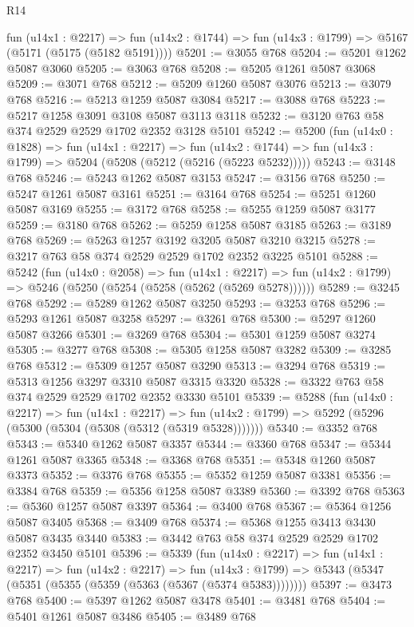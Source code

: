 \begin{lexlean}{R14}
\begin{coremodule}
    fun (u14x1 : @2217) =>
    fun (u14x2 : @1744) => fun (u14x3 : @1799) => @5167 (@5171 (@5175 (@5182 @5191))))
@5201 := @3055 @768
@5204 := @5201 @1262 @5087 @3060
@5205 := @3063 @768
@5208 := @5205 @1261 @5087 @3068
@5209 := @3071 @768
@5212 := @5209 @1260 @5087 @3076
@5213 := @3079 @768
@5216 := @5213 @1259 @5087 @3084
@5217 := @3088 @768
@5223 := @5217 @1258 @3091 @3108 @5087 @3113 @3118
@5232 := @3120 @763 @58 @374 @2529 @2529 @1702 @2352 @3128 @5101
@5242 := @5200
    (fun (u14x0 : @1828) =>
    fun (u14x1 : @2217) =>
    fun (u14x2 : @1744) => fun (u14x3 : @1799) => @5204 (@5208 (@5212 (@5216 (@5223 @5232)))))
@5243 := @3148 @768
@5246 := @5243 @1262 @5087 @3153
@5247 := @3156 @768
@5250 := @5247 @1261 @5087 @3161
@5251 := @3164 @768
@5254 := @5251 @1260 @5087 @3169
@5255 := @3172 @768
@5258 := @5255 @1259 @5087 @3177
@5259 := @3180 @768
@5262 := @5259 @1258 @5087 @3185
@5263 := @3189 @768
@5269 := @5263 @1257 @3192 @3205 @5087 @3210 @3215
@5278 := @3217 @763 @58 @374 @2529 @2529 @1702 @2352 @3225 @5101
@5288 := @5242
    (fun (u14x0 : @2058) =>
    fun (u14x1 : @2217) =>
    fun (u14x2 : @1799) => @5246 (@5250 (@5254 (@5258 (@5262 (@5269 @5278))))))
@5289 := @3245 @768
@5292 := @5289 @1262 @5087 @3250
@5293 := @3253 @768
@5296 := @5293 @1261 @5087 @3258
@5297 := @3261 @768
@5300 := @5297 @1260 @5087 @3266
@5301 := @3269 @768
@5304 := @5301 @1259 @5087 @3274
@5305 := @3277 @768
@5308 := @5305 @1258 @5087 @3282
@5309 := @3285 @768
@5312 := @5309 @1257 @5087 @3290
@5313 := @3294 @768
@5319 := @5313 @1256 @3297 @3310 @5087 @3315 @3320
@5328 := @3322 @763 @58 @374 @2529 @2529 @1702 @2352 @3330 @5101
@5339 := @5288
    (fun (u14x0 : @2217) =>
    fun (u14x1 : @2217) =>
    fun (u14x2 : @1799) => @5292 (@5296 (@5300 (@5304 (@5308 (@5312 (@5319 @5328)))))))
@5340 := @3352 @768
@5343 := @5340 @1262 @5087 @3357
@5344 := @3360 @768
@5347 := @5344 @1261 @5087 @3365
@5348 := @3368 @768
@5351 := @5348 @1260 @5087 @3373
@5352 := @3376 @768
@5355 := @5352 @1259 @5087 @3381
@5356 := @3384 @768
@5359 := @5356 @1258 @5087 @3389
@5360 := @3392 @768
@5363 := @5360 @1257 @5087 @3397
@5364 := @3400 @768
@5367 := @5364 @1256 @5087 @3405
@5368 := @3409 @768
@5374 := @5368 @1255 @3413 @3430 @5087 @3435 @3440
@5383 := @3442 @763 @58 @374 @2529 @2529 @1702 @2352 @3450 @5101
@5396 := @5339
    (fun (u14x0 : @2217) =>
    fun (u14x1 : @2217) =>
    fun (u14x2 : @2217) =>
    fun (u14x3 : @1799) => @5343 (@5347 (@5351 (@5355 (@5359 (@5363 (@5367 (@5374 @5383))))))))
@5397 := @3473 @768
@5400 := @5397 @1262 @5087 @3478
@5401 := @3481 @768
@5404 := @5401 @1261 @5087 @3486
@5405 := @3489 @768

\end{coremodule}
\end{lexlean}
